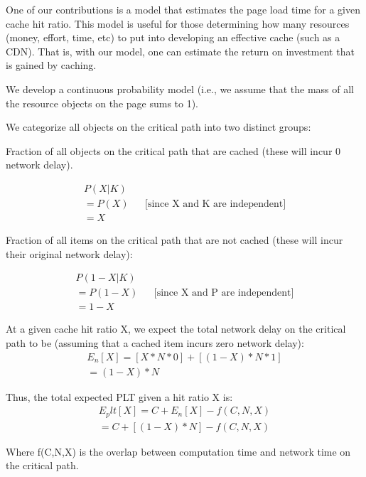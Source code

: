 One of our contributions is a model that estimates the page load time for a given cache hit ratio. This model is useful for those determining how many resources (money, effort, time, etc) to put into developing an effective cache (such as a CDN). 
That is, with our model, one can estimate the return on investment that is gained by caching.

We develop a continuous probability model (i.e., we assume that the mass of all the resource objects on the page sums to 1).



We categorize all objects on the critical path into two distinct groups:

Fraction of all objects on the critical path that are cached (these will incur 0 network delay).
    
\begin{align*}
P(X|K) \\
= P(X) && \text{[since X and K are independent]} \\
= X
\end{align*}

Fraction of all items on the critical path that are not cached (these will incur their original network delay):

\begin{align*}
P(1-X | K) \\
= P(1-X) && \text{[since X and P are independent]} \\
= 1-X
\end{align*}

At a given cache hit ratio X, we expect the total network delay on the critical path to be (assuming that a cached item incurs zero network delay):
\begin{align*}
E_n[X] = [X * N * 0] + [(1 - X) * N * 1] \\
= (1 - X) * N
\end{align*}

Thus, the total expected PLT given a hit ratio X is:
\begin{align*}
E_plt[X] = C + E_n[X] - f(C,N,X) \\
= C + [(1 - X) * N] - f(C,N,X)
\end{align*}

Where f(C,N,X) is the overlap between computation time and network time on the critical path.